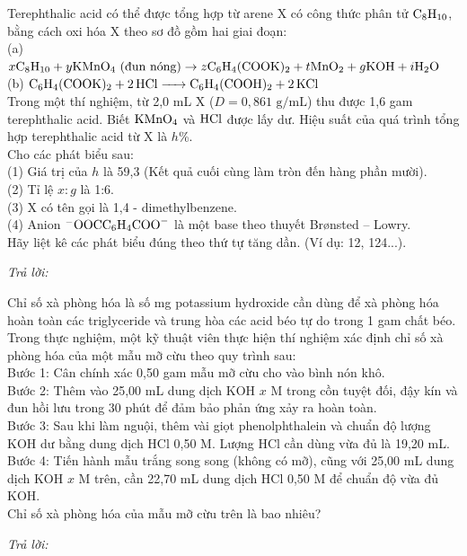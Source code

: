 \documentclass[11pt,a4paper]{article}
\begin{document}
\begin{ex}
Terephthalic acid có thể được tổng hợp từ arene X có công thức phân tử $\ce{C8H10}$, bằng cách oxi hóa X theo sơ đồ gồm hai giai đoạn:\\
(a) $x\ce{C8H10} + y\ce{KMnO4}\text{ (đun nóng)} \rightarrow z\ce{C6H4(COOK)2} + t\ce{MnO2} + g\ce{KOH} + i\ce{H2O}$\\
(b) $\ce{C6H4(COOK)2 + 2HCl -> C6H4(COOH)2 + 2KCl}$\\
Trong một thí nghiệm, từ 2,0 mL X ($D = 0{,}861\text{ g/mL}$) thu được 1,6 gam terephthalic acid. Biết $\ce{KMnO4}$ và $\ce{HCl}$ được lấy dư. Hiệu suất của quá trình tổng hợp terephthalic acid từ X là $h$\%.\\
Cho các phát biểu sau:\\
(1) Giá trị của $h$ là 59,3 (Kết quả cuối cùng làm tròn đến hàng phần mười).\\
(2) Tỉ lệ $x : g$ là 1:6.\\
(3) X có tên gọi là 1,4 - dimethylbenzene.\\
(4) Anion $^-\ce{OOCC6H4COO-}$ là một base theo thuyết Brønsted – Lowry.\\
Hãy liệt kê các phát biểu đúng theo thứ tự tăng dần. (Ví dụ: 12, 124...).

\textit{Trả lời:} \dotfill
\end{ex}
\begin{ex}
Chỉ số xà phòng hóa là số mg potassium hydroxide cần dùng để xà phòng hóa hoàn toàn các triglyceride và trung hòa các acid béo tự do trong 1 gam chất béo. Trong thực nghiệm, một kỹ thuật viên thực hiện thí nghiệm xác định chỉ số xà phòng hóa của một mẫu mỡ cừu theo quy trình sau:\\
Bước 1: Cân chính xác 0,50 gam mẫu mỡ cừu cho vào bình nón khô.\\
Bước 2: Thêm vào 25,00 mL dung dịch KOH $x$ M trong cồn tuyệt đối, đậy kín và đun hồi lưu trong 30 phút để đảm bảo phản ứng xảy ra hoàn toàn.\\
Bước 3: Sau khi làm nguội, thêm vài giọt phenolphthalein và chuẩn độ lượng KOH dư bằng dung dịch HCl 0,50 M. Lượng HCl cần dùng vừa đủ là 19,20 mL.\\
Bước 4: Tiến hành mẫu trắng song song (không có mỡ), cũng với 25,00 mL dung dịch KOH $x$ M trên, cần 22,70 mL dung dịch HCl 0,50 M để chuẩn độ vừa đủ KOH.\\
Chỉ số xà phòng hóa của mẫu mỡ cừu trên là bao nhiêu?

\textit{Trả lời:} \dotfill
\end{ex}
\end{document}
